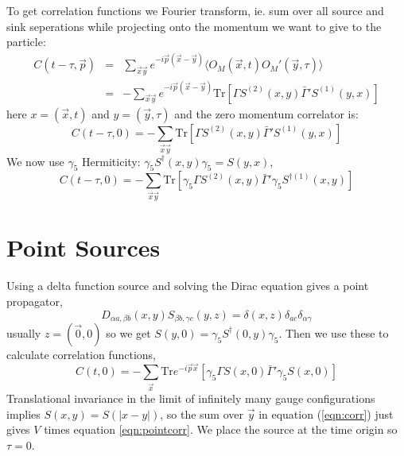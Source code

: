 \documentclass[3p,preprint]{elsarticle}
\begin{document}
To get correlation functions we Fourier transform, ie. sum over all source and sink seperations
while projecting onto the momentum we want to give to the particle:
\begin{eqnarray}
C(t - \tau, \vec{p}) &=& \sum_{\vec{x} \vec{y}} e^{-i \vec{p}(\vec{x} - \vec{y}) } \langle O_M(\vec{x}, t) O_M'(\vec{y}, \tau)\rangle \\
&=& -\sum_{\vec{x} \vec{y}} e^{-i \vec{p}(\vec{x} - \vec{y}) } \text{Tr}\left[ \Gamma S^{(2)} (x,y) \bar{ \Gamma }' S^{(1)} (y,x) \right]
\end{eqnarray}
here $x = (\vec{x}, t)$ and $y = (\vec{y}, \tau)$ and the zero momentum correlator is:
\begin{equation}
C(t - \tau, 0) = -\sum_{\vec{x} \vec{y}} \text{Tr}\left[ \Gamma S^{(2)} (x,y) \bar{ \Gamma }' S^{(1)} (y,x) \right]
\end{equation}
We now use $\gamma_5$ Hermiticity: $\gamma_5 S^\dagger(x,y) \gamma_5 = S(y,x)$,
\begin{equation}\label{eqn:corr}
C(t - \tau, 0) = -\sum_{\vec{x} \vec{y}} \text{Tr}\left[ \gamma_5 \Gamma S^{(2)} (x,y) \bar{ \Gamma }' \gamma_5 S^{\dagger (1)} (x,y) \right]
\end{equation}

\section{Point Sources}
Using a delta function source and solving the Dirac equation gives a point propagator,
\begin{equation}
	D_{\alpha a, \beta b} (x,y) S_{\beta b, \gamma c} (y, z) = \delta(x,z) \delta_{ac} \delta_{\alpha \gamma}
\end{equation}
usually $z = (\vec{0}, 0)$ so we get $S(y,0) = \gamma_5 S^{\dagger} (0,y) \gamma_5$. Then we use these to calculate
correlation functions,
\begin{equation}\label{eqn:pointcorr}
C(t, 0) = -\sum_{\vec{x}} \text{Tr} e^{-i \vec{p} \vec{x}} \left[ \gamma_5 \Gamma S (x,0) \bar{ \Gamma }' \gamma_5 S (x,0) \right]
\end{equation}
Translational invariance in the limit of infinitely many gauge configurations implies
$S(x,y) = S(|x - y|)$, so the sum over $\vec{y}$ in equation (\ref{eqn:corr}) just gives $V$ times equation 
\ref{eqn:pointcorr}.  We place the source at the time origin so $\tau = 0$.
\end{document}
